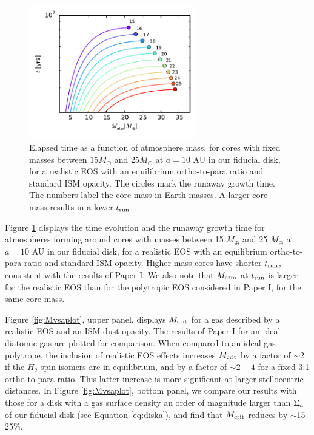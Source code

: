 \begin{figure}[H]
\centering
\includegraphics[width=0.65\textwidth]{figures/t_vs_M_10au.pdf}
\vspace{-0.35in}
\caption{Elapsed time as a function of atmosphere mass, for cores with fixed masses between $15 M_{\oplus}$ and $25 M_{\oplus}$ at $a=10$ AU in our fiducial disk, for a realistic EOS with an equilibrium ortho-to-para ratio and standard ISM opacity. The circles mark the runaway growth time. The numbers label the core mass in Earth masses. A larger core mass results in a lower $t_{\rm run}$.}%
\label{fig:tvsMplot}
\end{figure}


Figure \ref{fig:tvsMplot} displays the time evolution and the runaway growth time for atmospheres forming around cores with masses between 15 $M_{\oplus}$ and 25 $M_{\oplus}$ at $a=10$ AU in our fiducial disk, for a realistic EOS with an equilibrium ortho-to-para ratio and standard ISM opacity. Higher mass cores have shorter $t_{\rm run}$, consistent with the results of Paper I. We also note that $M_{\rm atm}$ at $t_{\rm run}$ is larger for the realistic EOS than for the polytropic EOS considered in Paper I, for the same core mass.

Figure \ref{fig:Mvsaplot}, upper panel, displays $M_{\rm crit}$
for a gas described by a realistic EOS and an ISM dust opacity. The results of Paper I for an ideal diatomic gas are plotted for comparison. When compared to an ideal gas polytrope, the inclusion of realistic EOS effects increases $M_{\rm crit}$ by a factor of $\sim$2 if the $H_2$ spin isomers are in equilibrium, and by a factor of $\sim$$2-4$ for a fixed 3:1 ortho-to-para ratio. This latter increase is more significant at larger stellocentric distances. In Figure \ref{fig:Mvsaplot}, bottom panel, we compare our results with those for a disk with a gas surface density an order of magnitude larger than $\Sigma_{\rm d}$ of our fiducial disk (see Equation \ref{eq:diska}), and find that $M_{\rm crit}$ reduces by $\sim$15-25$\%$.

